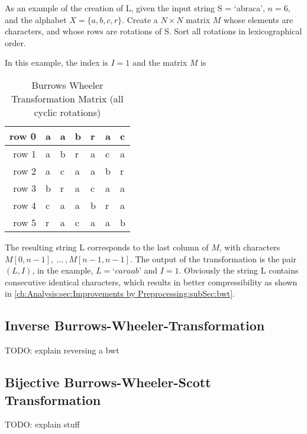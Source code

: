 \par {
As an example of the creation of L, given the input string S = ‘abraca’, $n = 6$, and the alphabet
$X = \{a,b,c,r\}$. Create a $N \times N$ matrix $M$ whose elements are characters, and
whose rows are rotations of S. Sort all rotations in lexicographical order.
}

\par{
In this example, the index is $I = 1$ and the matrix $M$ is

\begin{table}[h]
	\centering
	\begin{tabular}{r|l|l|l|l|l|l}
		row 0 & a & a & b & r & a & c\\
		\hline
		row 1 & a & b & r & a & c & a\\
		\hline
		row 2 & a & c & a & a & b & r\\
		\hline
		row 3 & b & r & a & c & a & a\\
		\hline
		row 4 & c & a & a & b & r & a\\
		\hline
		row 5 & r & a & c & a & a & b
		\label{tab:t10 bwt-example}
	\end{tabular}
	\caption{Burrows Wheeler Transformation Matrix (all cyclic rotations)}
\end{table}
The resulting string L corresponds to the last column of $M$, with characters $M[0,n -1],\: \dots \: ,M[n - 1, n - 1]$. The output of the transformation is the pair $(L, I)$, in the example, $L = ‘caraab’$ and $I = 1$. Obviously the string L contains consecutive identical characters, which results in better compressibility as shown in \ref{ch:Analysis:sec:Improvements by Preprocessing:subSec:bwt}.
}

\subsection{Inverse Burrows-Wheeler-Transformation}
\label{ch:Principles of compression:sec:Other:subSec:bwtInverse}

\par{
TODO: explain reversing a bwt
}

\subsection{Bijective Burrows-Wheeler-Scott Transformation}
\par{
TODO: explain stuff
}


